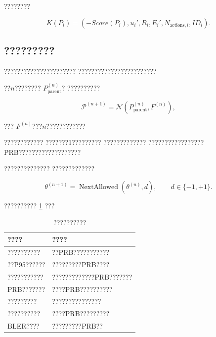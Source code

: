 ????????

\begin{equation}
K(P_i)
=
\left(
-Score(P_i),
u_i',
R_i,
E_i',
N_{\mathrm{actions},i},
ID_i
\right).
\label{eq:ranking_key_reduced}
\end{equation}


\subsection*{?????????}

??????????????????????
????????????????????????

??$n$????????
$P_{\mathrm{parent}}^{(n)}$?
??????????

\begin{equation}
\mathcal{P}^{(n+1)}
=
\mathcal{N}
\left(
P_{\mathrm{parent}}^{(n)},
F^{(n)}
\right),
\label{eq:feedback_neighborhood_reduced}
\end{equation}

???
$F^{(n)}$???$n$????????????

????????????
???????1?????????
?????????????
?????????????????
PRB???????????????????

??????????????
?????????????

\begin{equation}
\theta^{(n+1)}
=
\operatorname{NextAllowed}
\left(
\theta^{(n)},
d
\right),
\qquad
d\in\{-1,+1\}.
\label{eq:adjacent_parameter_reduced}
\end{equation}

??????????
\ref{tab:feedback_rules_reduced}
???

\begin{table}[H]
    \centering
    \caption{??????????}
    \label{tab:feedback_rules_reduced}
    \small
    \renewcommand{\arraystretch}{1.25}
    \begin{tabularx}{\textwidth}{
        >{\raggedright\arraybackslash}p{}
        >{\raggedright\arraybackslash}X
    }
        \toprule
        ???? & ???? \\
        \midrule

        ??????????
        & ??PRB???????????
        \\

        ??P95??????
        & ?????????PRB????
        \\

        ???????????
        & ?????????????PRB???????
        \\

        PRB???????
        & ????PRB??????????
        \\

        ?????????
        & ???????????????
        \\

        ??????????
        & ????PRB?????????
        \\

        BLER????
        & ?????????PRB??
        \\

        \bottomrule
    \end{tabularx}
\end{table}

